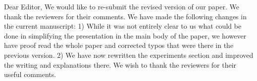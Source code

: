 Dear Editor,
We would like to re-submit the revised version of our paper. We thank the reviewers for their comments. We have made the following changes in the current manuscript:
1) While it was not entirely clear to us what could be done in simplifying the presentation in the main body of the paper, we however have proof read
the whole paper and corrected typos that were there in the previous version. 
2) We have now rewritten the experiments section and improved the writing and explanations there.
We wish to thank the reviewers for their useful comments. 


